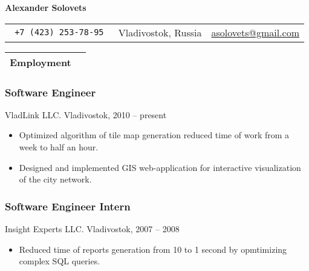 \documentclass[a4paper]{article}
\def\name{Alexander Solovets}
\begin{document}
\color{dark-gray}
\sf

\begin{center}
	{\Huge \bfseries \name}
	\vskip 4pt
	\begin{tabular}{r|c|r}
		\tt
		+7 (423) 253-78-95 & Vladivostok, Russia & \href{mailto:asolovets@gmail.com}{asolovets@gmail.com}\\
	\end{tabular}
\end{center}

\small

	\begin{tabularx}{\textwidth}{@{}lX}
		\textbf{\large Employment}\\
		\hline\hline
	\end{tabularx}
		\begin{multicols}{2}
			\raggedcolumns
			\subsubsection*{Software Engineer}
			VladLink LLC. Vladivostok, 2010 -- present
			\begin{itemize}
				\item Optimized algorithm of tile map generation reduced time of work from a week to half an hour.
				\item Designed and implemented GIS web-application for interactive visualization of the city network.
			\end{itemize}

			\columnbreak

			\subsubsection*{Software Engineer Intern}
			Insight Experts LLC. Vladivostok, 2007 -- 2008
			\begin{itemize}
				\item Reduced time of reports generation from 10 to 1 second by opmtimizing complex SQL queries.
			\end{itemize}
		\end{multicols}

\end{document}
